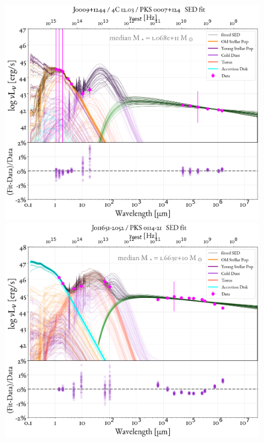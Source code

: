 \begin{figure}
    \centering
    \includegraphics[width=0.85\linewidth]{figures/ResultFits/111_SEDfit_5325.png}\\
    \includegraphics[width=0.85\linewidth]{figures/ResultFits/112_SEDfit_5348.png}   
\end{figure}
